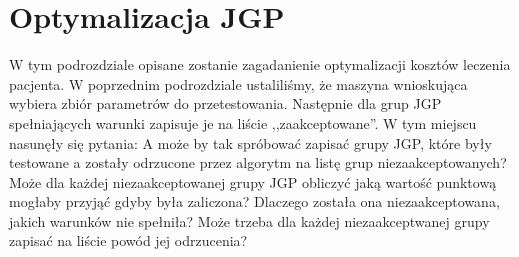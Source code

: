 \section{Optymalizacja JGP}
\label{sec:optymalizacjaJGP}

W tym podrozdziale opisane zostanie zagadanienie optymalizacji kosztów leczenia pacjenta. W poprzednim podrozdziale ustaliliśmy, że maszyna wnioskująca wybiera zbiór parametrów do przetestowania. Następnie dla grup JGP spełniających warunki zapisuje je na liście ,,zaakceptowane''. W tym miejscu nasunęły się pytania: A może by tak spróbować zapisać grupy JGP, które były testowane a zostały odrzucone przez algorytm na listę grup niezaakceptowanych? Może dla każdej niezaakceptowanej grupy JGP obliczyć jaką wartość punktową mogłaby przyjąć gdyby była zaliczona? Dlaczego została ona niezaakceptowana, jakich warunków nie spełniła? Może trzeba dla każdej niezaakceptwanej grupy zapisać na liście powód jej odrzucenia? 

